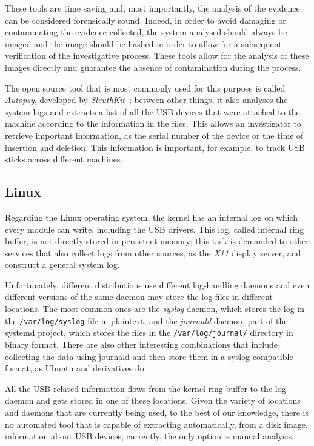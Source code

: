 \documentclass[a4paper,twocolumn]{article}
\begin{document}
These tools are time saving and, most importantly, the analysis of the evidence
can be considered forensically sound. Indeed, in order to avoid damaging or
contaminating the evidence collected, the system analysed should always be
imaged and the image should be hashed in order to allow for a subsequent
verification of the investigative process. These tools allow for the analysis of
these images directly and guarantee the absence of contamination during the
process.~\cite{murphey2007automated}

The open source tool that is most commonly used for this purpose is called
\emph{Autopsy}, developed by \emph{SleuthKit}~\cite{sleuthkit}; between other
things, it also analyses the system logs and extracts a list of all the USB
devices that were attached to the machine according to the information in the
files. This allows an investigator to retrieve important information, as the
serial number of the device or the time of insertion and deletion. This
information is important, for example, to track USB sticks across different
machines.~\cite{deb2015usb}

\subsection{Linux}
Regarding the Linux operating system, the kernel has an internal log on which
every module can write, including the USB drivers. This log, called internal
ring buffer, is not directly stored in persistent memory; this task is demanded
to other services that also collect logs from other sources, as the \emph{X11}
display server, and construct a general system log.

Unfortunately, different distributions use different log-handling daemons and
even different versions of the same daemon may store the log files in
different locations. The most common ones are the \emph{syslog} daemon, which
stores the log in the \texttt{/var/log/syslog} file in plaintext, and the
\emph{journald} daemon, part of the systemd project, which stores the files in
the \texttt{/var/log/journal/} directory in binary format. There are also other
interesting combinations that include collecting the data using journald and
then store them in a syslog compatible format, as Ubuntu and derivatives
do.~\cite{poettering2012journal}

All the USB related information flows from the kernel ring buffer to the log
daemon and gets stored in one of these locations. Given the variety of locations
and daemons that are currently being used, to the best of our knowledge, there
is no automated tool that is capable of extracting automatically, from a disk
image, information about USB devices; currently, the only option is manual
analysis.
\end{document}
